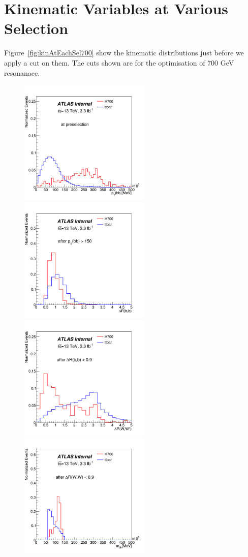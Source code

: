 \section {Kinematic Variables at Various Selection}
Figure~\ref{fig:kinAtEachSel700} show the kinematic distributions just before we apply a cut on them. The cuts shown are for the optimisation of 700 GeV resonanace. 
\newpage
\begin{figure}[h!]
\begin{center}
		\includegraphics[height=60mm]{figures/kinAtEachSel700/PRE_ss_bbPt.png} 
		\includegraphics[height=60mm]{figures/kinAtEachSel700/SR_opt700_bbpt150_drbb.png}
		\includegraphics[height=60mm]{figures/kinAtEachSel700/SR_opt700_bbpt150_drbb09_drww.png} 
		\includegraphics[height=60mm]{figures/kinAtEachSel700/SR_opt700_bbpt150_drbb09_drww09_bbMass.png}

\end{center}
\end{figure}

